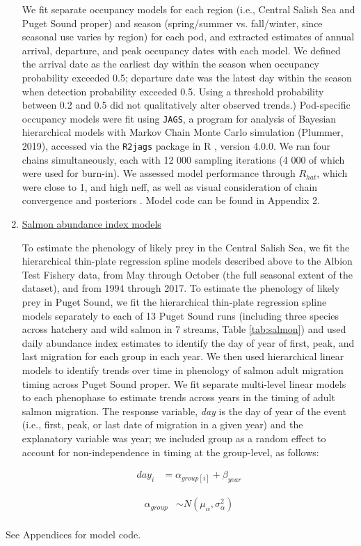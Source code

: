 \documentclass{article}
\begin{document}
\begin{enumerate}
 
\par We fit separate occupancy models for each region (i.e., Central Salish Sea and Puget Sound proper) and season (spring/summer vs. fall/winter, since seasonal use varies by region) for each pod, and extracted estimates of annual arrival, departure, and peak occupancy dates with each model. We defined the arrival date as the earliest day within the season when occupancy probability exceeded 0.5; departure date was the latest day within the season when detection probability exceeded 0.5. Using a threshold probability between 0.2 and 0.5 did not qualitatively alter observed trends.) Pod-specific occupancy models were fit using \texttt{JAGS}, a program for analysis of Bayesian hierarchical models with Markov Chain Monte Carlo simulation (Plummer, 2019), accessed via the \texttt{R2jags} package \citep{su2021} in R \citep{Rcore2021}, version 4.0.0. We ran four chains simultaneously, each with 12 000 sampling iterations (4 000 of which were used for burn-in). We assessed model performance through $R_{hat}$, which were close to 1, and high neff, as well as visual consideration of chain convergence and posteriors \citep{BDA}. Model code can be found in Appendix 2.
\item \underline {Salmon abundance index models}
\par To estimate the phenology of likely prey in the Central Salish Sea, we fit the hierarchical thin-plate regression spline models described above to the Albion Test Fishery data, from May through October (the full seasonal extent of the dataset), and from 1994 through 2017. To estimate the phenology of likely prey in Puget Sound, we fit the hierarchical thin-plate regression spline models separately to each of 13 Puget Sound runs (including three species across hatchery and wild salmon in 7 streams, Table \ref{tab:salmon}) and used daily abundance index estimates to identify the day of year of first, peak, and last migration for each group in each year. We then used hierarchical linear models to identify trends over time in phenology of salmon adult migration timing across Puget Sound proper.  We fit  separate multi-level linear models to each phenophase to estimate trends across years in the timing of adult salmon migration. The response variable, \emph{day} is the day of year of the event (i.e., first, peak, or last date of migration in a given year) and the explanatory variable was year; we included group as a random effect to account for non-independence in timing at the group-level, as follows:

\begin{align*}
day_i &= \alpha_{group[i]} + \beta_{year}
\end{align*}

\begin{align*}
\alpha_{group} & \sim N(\mu_{\alpha}, \sigma^{2}_{\alpha}) \\
\end{align*}

\end{enumerate}
See Appendices for model code.
\end{document}
